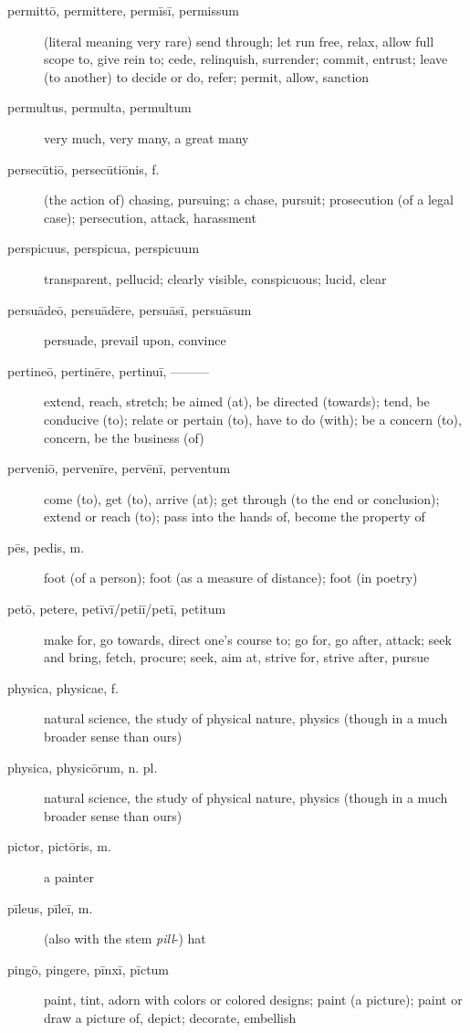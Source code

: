 \begin{description}
    \item[permittō, permittere, permīsī, permissum] \marginnote{*}(literal meaning very rare) send through; let run free, relax, allow full scope to, give rein to; cede, relinquish, surrender; commit, entrust; leave (to another) to decide or do, refer; permit, allow, sanction
    \item[permultus, permulta, permultum] very much, very many, a great many
    \item[persecūtiō, persecūtiōnis, f.] (the action of) chasing, pursuing; a chase, pursuit; prosecution (of a legal case); persecution, attack, harassment
    \item[perspicuus, perspicua, perspicuum] transparent, pellucid; clearly visible, conspicuous; lucid, clear
    \item[persuādeō, persuādēre, persuāsī, persuāsum] \marginnote{*}persuade, prevail upon, convince
    \item[pertineō, pertinēre, pertinuī, ———] \marginnote{*}extend, reach, stretch; be aimed (at), be directed (towards); tend, be conducive (to); relate or pertain (to), have to do (with); be a concern (to), concern, be the business (of)
    \item[perveniō, pervenīre, pervēnī, perventum] \marginnote{*}come (to), get (to), arrive (at); get through (to the end or conclusion); extend or reach (to); pass into the hands of, become the property of
    \item[pēs, pedis, m.] \marginnote{*}foot (of a person); foot (as a measure of distance); foot (in poetry)
    \item[petō, petere, petīvī/petiī/petī, petitum] \marginnote{*}make for, go towards, direct one's course to; go for, go after, attack; seek and bring, fetch, procure; seek, aim at, strive for, strive after, pursue
    \item[physica, physicae, f.] natural science, the study of physical nature, physics (though in a much broader sense than ours)
    \item[physica, physicōrum, n. pl.] natural science, the study of physical nature, physics (though in a much broader sense than ours)
    \item[pictor, pictōris, m.] a painter
    \item[pīleus, pīleī, m.] (also with the stem \textit{pill}-) hat
    \item[pingō, pingere, pīnxī, pīctum] paint, tint, adorn with colors or colored designs; paint (a picture); paint or draw a picture of, depict; decorate, embellish

\end{description}
